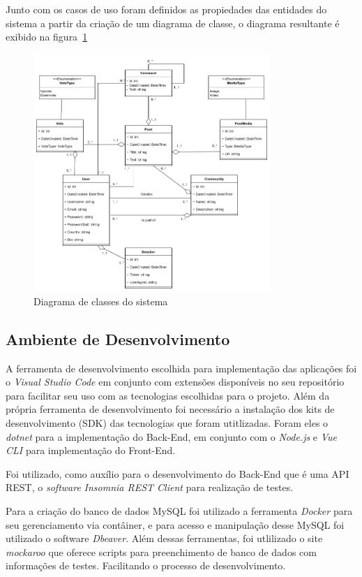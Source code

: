 \documentclass[12pt]{article}
\begin{document}
Junto com os casos de uso foram definidos as propiedades das entidades do sistema
a partir da criação de um diagrama de classe, o diagrama resultante é exibido na figura~\ref{fig:classes_diagram}

\begin{figure}[H]
    \centering
    \includegraphics[width=0.8\textwidth]{diagrams/classes_diagram.png}
    \caption{Diagrama de classes do sistema}\label{fig:classes_diagram}
\end{figure}

\subsection{Ambiente de Desenvolvimento}

A ferramenta de desenvolvimento escolhida para implementação
das aplicações foi o \textit{Visual Studio Code} em conjunto com extensões disponíveis
no seu repositório para facilitar seu uso com as tecnologias escolhidas para o projeto. Além
da própria ferramenta de desenvolvimento foi necessário a instalação dos kits de desenvolvimento
(SDK) das tecnologias que foram utitlizadas. Foram eles o \textit{dotnet} para a implementação do Back-End,
em conjunto com o \textit{Node.js} e \textit{Vue CLI} para implementação do Front-End.

Foi utilizado, como auxílio para o desenvolvimento do Back-End que é uma API REST, o
\textit{software} \textit{Insomnia REST Client} para realização de testes.

Para a criação do banco de dados MySQL foi utilizado a ferramenta \textit{Docker} para
seu gerenciamento via contâiner, e para acesso e manipulação desse MySQL foi utilizado o software \textit{Dbeaver}.
Além dessas ferramentas, foi utlilizado o site \textit{mockaroo} que oferece scripts para preenchimento
de banco de dados com informações de testes. Facilitando o processo de desenvolvimento.
\end{document}
